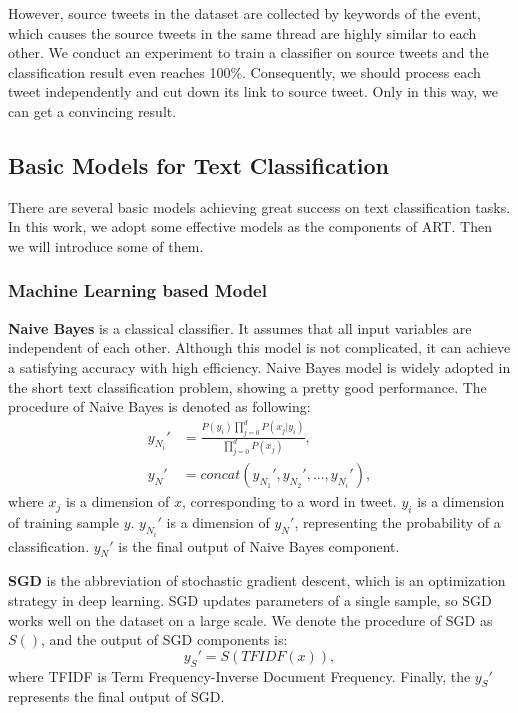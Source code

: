 However, source tweets in the dataset are collected by keywords of the event, which causes the source tweets in the same thread are highly similar to each other. We conduct an experiment to train a classifier on source tweets and the classification result even reaches 100\%. Consequently, we should process each tweet independently and cut down its link to source tweet. Only in this way, we can get a convincing result. 

\subsection{Basic Models for Text Classification}
\label{sec:deeplearning_model} There are several basic models achieving great success on text classification tasks.  In this work, we adopt some effective models as the components of ART. Then we will introduce some of them.

\subsubsection{Machine Learning based Model}
\textbf{Naive Bayes} is a classical classifier. It assumes that all input variables are independent of each other. Although this model is not complicated, it can achieve a satisfying accuracy with high efficiency. Naive Bayes model is widely adopted in the short text classification problem, showing a pretty good performance. The procedure of Naive Bayes is denoted as following:
\begin{align}\label{eq:nb}
y_{N_{i}}' &= \frac{P(y_i)\prod_{j = 0}^d P(x_j|y_i)}{\prod_{j = 0}^d P(x_j)},\\
y_N' &= concat(y_{N_{1}}',y_{N_{2}}',..., y_{N_{i}}'),
\end{align}
where $x_j$ is a dimension of $x$, corresponding to a word in tweet.  $y_i$ is a dimension of training sample $y$. $y_{N_{i}}'$ is a dimension of $y_N'$, representing the probability of a classification. $y_N'$ is the final output of Naive Bayes component.

\textbf{SGD} is the abbreviation of stochastic gradient descent, which is an optimization strategy in deep learning. SGD updates parameters of a single sample, so SGD works well on the dataset on a large scale. We denote the procedure of SGD as $S()$, and the output of SGD components is:
\begin{equation}\label{eq:sgd}
y_S' = S(TFIDF(x)),
\end{equation}
where TFIDF is Term Frequency-Inverse Document Frequency. Finally, the $y_S'$ represents the final output of SGD.

